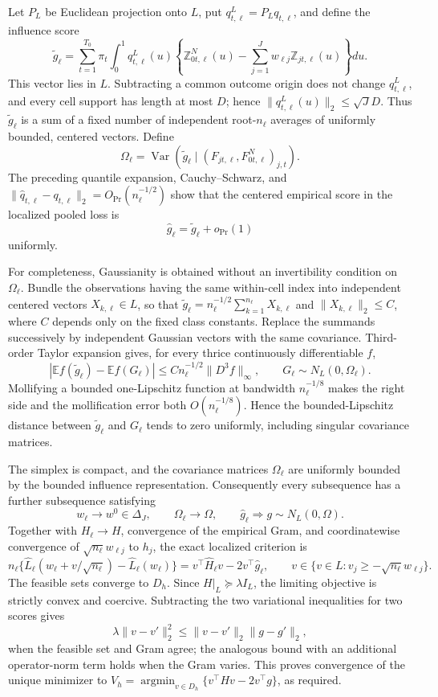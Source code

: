 Let \(P_L\) be Euclidean projection onto \(L\), put
\(q^L_{t,\ell}=P_Lq_{t,\ell}\), and define the influence score
\[
 \widetilde g_\ell=
 \sum_{t=1}^{T_0}\pi_t\int_0^1q^L_{t,\ell}(u)
 \left\{\mathbb Z^N_{0t,\ell}(u)
       -\sum_{j=1}^Jw_{\ell j}\mathbb Z_{jt,\ell}(u)\right\}du.
\]
This vector lies in \(L\).  Subtracting a common outcome origin does not change \(q^L_{t,\ell}\), and every cell support has length at most \(D\); hence
\(\|q^L_{t,\ell}(u)\|_2\leq\sqrt J D\).  Thus \(\widetilde g_\ell\) is a sum of a fixed number of independent root-\(n_\ell\) averages of uniformly bounded, centered vectors.  Define
\[
 \Omega_\ell=\operatorname{Var}(\widetilde g_\ell\mid
  (F_{jt,\ell},F^N_{0t,\ell})_{j,t}).
\]
The preceding quantile expansion, Cauchy--Schwarz, and
\(\|\widehat q_{t,\ell}-q_{t,\ell}\|_2=O_{\Pr}(n_\ell^{-1/2})\) show that the centered empirical score in the localized pooled loss is
\[
 \widehat g_\ell=\widetilde g_\ell+o_{\Pr}(1)
\]
uniformly.

For completeness, Gaussianity is obtained without an invertibility condition on \(\Omega_\ell\).  Bundle the observations having the same within-cell index into independent centered vectors \(X_{k,\ell}\in L\), so that
\(\widetilde g_\ell=n_\ell^{-1/2}\sum_{k=1}^{n_\ell}X_{k,\ell}\) and \(\|X_{k,\ell}\|_2\leq C\), where \(C\) depends only on the fixed class constants.  Replace the summands successively by independent Gaussian vectors with the same covariance.  Third-order Taylor expansion gives, for every thrice continuously differentiable \(f\),
\[
 \left|\mathbb Ef(\widetilde g_\ell)-\mathbb Ef(G_\ell)\right|
 \leq C n_\ell^{-1/2}\|D^3f\|_\infty,
 \qquad G_\ell\sim N_L(0,\Omega_\ell).
\]
Mollifying a bounded one-Lipschitz function at bandwidth
\(n_\ell^{-1/8}\) makes the right side and the mollification error both \(O(n_\ell^{-1/8})\).  Hence the bounded-Lipschitz distance between \(\widetilde g_\ell\) and \(G_\ell\) tends to zero uniformly, including singular covariance matrices.

The simplex is compact, and the covariance matrices \(\Omega_\ell\) are uniformly bounded by the bounded influence representation.  Consequently every subsequence has a further subsequence satisfying
\[
 w_\ell\longrightarrow w^0\in\Delta_J,
 \qquad \Omega_\ell\longrightarrow\Omega,
 \qquad \widehat g_\ell\Rightarrow g\sim N_L(0,\Omega).
\]
Together with \(H_\ell\to H\), convergence of the empirical Gram, and coordinatewise convergence of \(\sqrt{n_\ell}w_{\ell j}\) to \(h_j\), the exact localized criterion is
\[
 n_\ell\{\widehat L_\ell(w_\ell+v/\sqrt{n_\ell})-
              \widehat L_\ell(w_\ell)\}
 =v^\top\widehat H_\ell v-2v^\top\widehat g_\ell,
 \qquad v\in\{v\in L:v_j\geq-\sqrt{n_\ell}w_{\ell j}\}.
\]
The feasible sets converge to \(D_h\).  Since \(H|_L\succeq\lambda I_L\), the limiting objective is strictly convex and coercive.  Subtracting the two variational inequalities for two scores gives
\[
 \lambda\|v-v'\|_2^2
 \leq \|v-v'\|_2\|g-g'\|_2,
\]
when the feasible set and Gram agree; the analogous bound with an additional operator-norm term holds when the Gram varies.  This proves convergence of the unique minimizer to
\(V_h=\operatorname*{argmin}_{v\in D_h}
\{v^\top Hv-2v^\top g\}\), as required.


